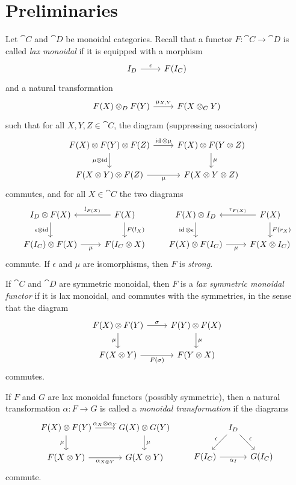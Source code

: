 \documentclass[12pt,oneside,article,draft]{memoir}
\begin{document}
\section{Preliminaries}

Let $\cat{C}$ and $\cat{D}$ be monoidal categories. Recall that a functor $F\colon\cat{C}\to\cat{D}$ is called \emph{lax monoidal} if it is equipped with a morphism
\[
\begin{tikzcd}
	I_D \rar{\epsilon} & F(I_C)
\end{tikzcd}
\]
and a natural transformation
\[
\begin{tikzcd}
	F(X) \otimes_D F(Y) \rar{\mu_{X,Y}} & F(X\otimes_C Y)
\end{tikzcd}
\]
such that for all $X,Y,Z\in\cat{C}$, the diagram (suppressing associators)
\[
\begin{tikzcd}
	F(X)\otimes F(Y) \otimes F(Z)
		\rar{\id\otimes\mu}
		\dar[swap]{\mu\otimes\id}
	& F(X)\otimes F(Y\otimes Z)
		\dar{\mu} \\
	F(X\otimes Y)\otimes F(Z)
		\rar[swap]{\mu}
	& F(X\otimes Y\otimes Z)
\end{tikzcd}
\]
commutes, and for all $X\in\cat{C}$ the two diagrams
\[
\begin{tikzcd}
	I_D\otimes F(X)
		\dar[swap]{\epsilon\otimes\id}
	& F(X)
		\lar[swap]{l_{F(X)}}
		\dar{F(l_X)} \\
	F(I_C)\otimes F(X)
		\rar[swap]{\mu}
	& F(I_C\otimes X)
\end{tikzcd}
\qquad
\begin{tikzcd}
	F(X) \otimes I_D
		\dar[swap]{\id\otimes\epsilon}
	& F(X)
		\lar[swap]{r_{F(X)}}
		\dar{F(r_X)} \\
	F(X)\otimes F(I_C)
		\rar[swap]{\mu}
	& F(X\otimes I_C)
\end{tikzcd}
\]
commute. If $\epsilon$ and $\mu$ are isomorphisms, then $F$ is \emph{strong}.

If $\cat{C}$ and $\cat{D}$ are symmetric monoidal, then $F$ is a \emph{lax symmetric monoidal functor} if it is lax monoidal, and commutes with the symmetries, in the sense that the diagram
\[
\begin{tikzcd}
	F(X)\otimes F(Y)
		\rar{\sigma}
		\dar[swap]{\mu}
	& F(Y)\otimes F(X)
		\dar{\mu} \\
	F(X\otimes Y)
		\rar[swap]{F(\sigma)}
	& F(Y\otimes X)
\end{tikzcd}
\]
commutes.

If $F$ and $G$ are lax monoidal functors (possibly symmetric), then a natural transformation $\alpha\colon F\to G$ is called a \emph{monoidal transformation} if the diagrams
\[
\begin{tikzcd}
	F(X)\otimes F(Y)
		\rar{\alpha_X\otimes\alpha_Y}
		\dar[swap]{\mu}
	& G(X)\otimes G(Y)
		\dar{\mu} \\
	F(X\otimes Y)
		\rar[swap]{\alpha_{X\otimes Y}}
	& G(X\otimes Y)
\end{tikzcd}
\qquad
\begin{tikzcd}[column sep=tiny]
	{} & I_D \dlar[swap]{\epsilon} \drar{\epsilon} & \\
	F(I_C) \ar{rr}[swap]{\alpha_I} && G(I_C)
\end{tikzcd}
\]
commute.
\end{document}
